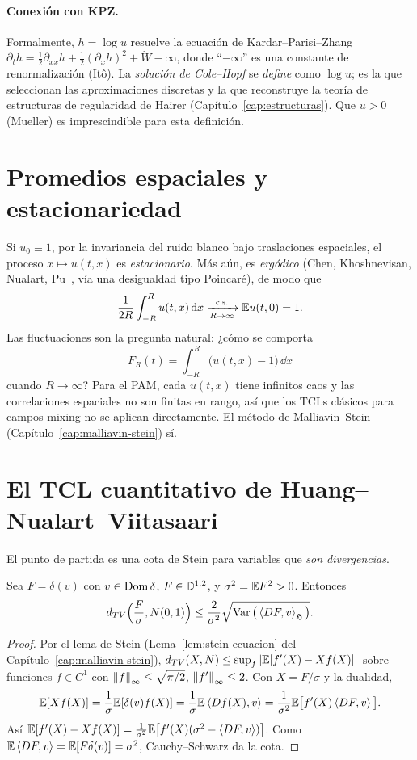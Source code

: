 \paragraph{Conexión con KPZ.} Formalmente, $h=\log u$ resuelve la ecuación de Kardar--Parisi--Zhang
$\partial_th=\frac12\partial_{xx}h+\frac12(\partial_xh)^2+\dot W-\infty$, donde ``$-\infty$'' es una constante de renormalización (Itô). La
\emph{solución de Cole--Hopf} se \emph{define} como $\log u$; es la que seleccionan las aproximaciones discretas y
la que reconstruye la teoría de estructuras de regularidad de Hairer (Capítulo~\ref{cap:estructuras}). Que $u>0$
(Mueller) es imprescindible para esta definición.

\section{Promedios espaciales y estacionariedad}
Si $u_0\equiv1$, por la invariancia del ruido blanco bajo traslaciones espaciales, el proceso $x\mapsto u(t,x)$
es \emph{estacionario}. Más aún, es \emph{ergódico} (Chen, Khoshnevisan, Nualart, Pu~\cite{ChenKhoshnevisanNualartPu21}, vía una desigualdad
tipo Poincaré), de modo que
\[
  \frac1{2R}\int_{-R}^Ru(t,x)\,\mathrm{d} x\xrightarrow[R\to\infty]{\text{c.s.}}\mathbb{E} u(t,0)=1.
\]
Las fluctuaciones son la pregunta natural: ¿cómo se comporta
\[
  F_R(t)=\int_{-R}^R\big(u(t,x)-1\big)\,\dd x
\]
cuando $R\to\infty$? Para el PAM, cada $u(t,x)$ tiene infinitos caos y las correlaciones espaciales no
son finitas en rango, así que los TCLs clásicos para campos mixing no se aplican directamente.
El método de Malliavin--Stein (Capítulo~\ref{cap:malliavin-stein}) sí.

\section{El TCL cuantitativo de Huang--Nualart--Viitasaari}
El punto de partida es una cota de Stein para variables que \emph{son divergencias}.

\begin{proposicion}\label{prop:stein-divergencia}
Sea $F=\delta(v)$ con $v\in\operatorname{Dom}\delta$, $F\in\mathbb{D}^{1,2}$, y $\sigma^2=\mathbb{E} F^2>0$. Entonces
\[
  d_{TV}\Big(\frac F\sigma,N(0,1)\Big)\le\frac2{\sigma^2}\sqrt{\operatorname{Var}\big(\left\langle DF, v\right\rangle_{\mathfrak{H}}\big)}.
\]
\end{proposicion}

\begin{proof}
Por el lema de Stein (Lema~\ref{lem:stein-ecuacion} del Capítulo~\ref{cap:malliavin-stein}), $d_{TV}(X,N)\le
\sup_f\left\lvert \mathbb{E}[f'(X)-Xf(X)]\right\rvert$ sobre funciones $f\in C^1$ con $\left\lVert f\right\rVert_\infty\le\sqrt{\pi/2}$, $\left\lVert f'\right\rVert_\infty\le2$. Con
$X=F/\sigma$ y la dualidad,
\[
  \mathbb{E}[Xf(X)]=\frac1\sigma\mathbb{E}[\delta(v)f(X)]=\frac1\sigma\mathbb{E}\left\langle Df(X), v\right\rangle=\frac1{\sigma^2}\mathbb{E}\big[f'(X)\left\langle DF, v\right\rangle\big].
\]
Así $\mathbb{E}[f'(X)-Xf(X)]=\frac1{\sigma^2}\mathbb{E}\big[f'(X)(\sigma^2-\left\langle DF, v\right\rangle)\big]$. Como $\mathbb{E}\left\langle DF, v\right\rangle=\mathbb{E}[F\delta(v)]=\sigma^2$, Cauchy--Schwarz
da la cota.
\end{proof}

